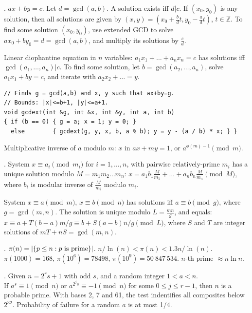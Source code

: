 
. $ax+by=c$.
Let $d=\gcd(a,b)$. A solution exists iff $d|c$.
If $(x_0,y_0)$ is any solution, then all solutions are given by
$(x,y) = (x_0 + \frac{b}{d}t, y_0 - \frac{a}{d}t)$, $t \in {\mathbb Z}$.
To find some solution $(x_0, y_0)$, use extended GCD to solve
$ax_0 + by_0 = d = \gcd(a, b)$, and multiply its solutions by $\frac{c}{d}$.

Linear diophantine equation in $n$ variables:
$a_1 x_1 + \dots + a_n x_n = c$ has solutions iff $\gcd(a_1, \dots, a_n) | c$.
To find some solution, let $b=\gcd(a_2, \dots, a_n)$,
solve $a_1 x_1 + by = c$, and iterate with $a_2 x_2 + \dots = y$.

\begin{verbatim}
// Finds g = gcd(a,b) and x, y such that ax+by=g.
// Bounds: |x|<=b+1, |y|<=a+1.
void gcdext(int &g, int &x, int &y, int a, int b)
{ if (b == 0) { g = a; x = 1; y = 0; }
  else        { gcdext(g, y, x, b, a % b); y = y - (a / b) * x; } }
\end{verbatim}

Multiplicative inverse of $a$ modulo $m$:
$x$ in $ax + my = 1$, or $a^{\phi(m)-1} \pmod{m}$.

.
System $x \equiv a_i \pmod{m_i}$ for $i=1,\dots,n$, with
pairwise relatively-prime $m_i$ has a unique solution modulo $M = m_1 m_2 \dots m_n$:
$x = a_1 b_1 \frac{M}{m_1} + \dots + a_n b_n \frac{M}{m_n} \pmod{M}$,
where $b_i$ is modular inverse of $\frac{M}{m_i}$ modulo $m_i$.

System $x \equiv a \pmod{m}$, $x \equiv b \pmod{n}$ has solutions
iff $a \equiv b \pmod{g}$, where $g=\gcd(m,n)$.
The solution is unique modulo $L=\frac{mn}{g}$, and equals:
$x \equiv a + T(b-a) m/g \equiv b + S(a-b) n/g \pmod{L}$,
where $S$ and $T$ are integer solutions of $mT + nS = \gcd(m,n)$.

. $\pi(n) = |\{p \le n : p \hbox{ is prime}\}|$.
$n/\ln(n) < \pi(n) < 1.3 n/\ln(n)$.
$\pi(1000) = 168$, $\pi(10^6) = 78498$, $\pi(10^9) = 50\ 847\ 534$.
\quad $n$-th prime $\approx n \ln n$.

.
Given $n = 2^r s + 1$ with odd $s$, and a random integer $1 < a < n$. \\
If $a^s \equiv 1 {\pmod n}$ or $a^{2^j s} \equiv -1 {\pmod n}$ for some
$0 \le j \le r-1$, then $n$ is a probable prime.
With bases 2, 7 and 61, the test indentifies all composites below $2^{32}$.
Probability of failure for a random $a$ is at most 1/4.


